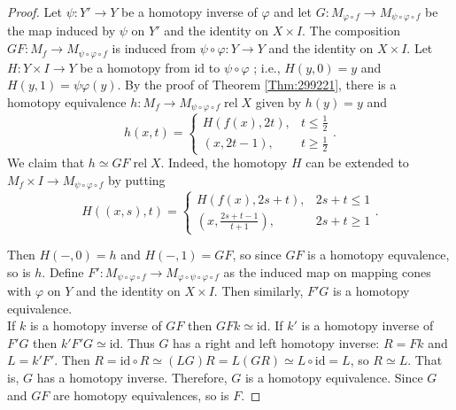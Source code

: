 \documentclass[reqno]{amsart}
\theoremstyle{definition}
\theoremstyle{remark}
\DeclareMathOperator{\rel}{rel}
\newcommand{\id}{{\mathrm{id}}}
\begin{document}
\begin{proof}
    Let $\psi  \colon Y' \to Y$ be a homotopy inverse
    of $\varphi $ and let $G \colon 
    M_{\varphi \circ f} \to M_{\psi \circ
    \varphi \circ f}$ be the map induced by
    $\psi $ on $Y'$ and the identity on $X \times I$.
    The composition $GF \colon M_f \to M_{\psi \circ \varphi 
    \circ f}$ is induced from $\psi \circ \varphi \colon
    Y \to Y$ and the identity on $X \times I$.
    Let $H \colon Y \times I \to Y$ be a homotopy from
    $\id$ to $\psi \circ \varphi $ ; i.e.,
    $H(y,0) = y$ and $H(y,1) = 
    \psi \varphi (y)$. 
    By the proof of Theorem \ref{Thm:299221}, there is a
    homotopy equivalence
    $h \colon M_f \to M_{\psi \circ \varphi \circ f}\rel X$ given
    by $h(y) = y$ and
     \[
    h(x,t) = 
    \begin{cases}
        H\left( f(x), 2t \right) ,& t\le \frac{1}{2}\\
        (x,2t-1),& t\ge \frac{1}{2}
    \end{cases}.
    \] 
    We claim that
    $h \simeq GF \rel X$. Indeed, the homotopy $H$ can
    be extended to 
    $M_f \times I \to M_{\psi \circ \varphi \circ f}$ by
    putting
    \[
    H\left( (x,s),t \right) 
    =
    \begin{cases}
        H\left( f(x), 2s+t \right) ,& 2s+t \le 1\\
        \left( x, \frac{2s+t-1}{t+1} \right) ,& 2s+t\ge 1
    \end{cases}.
    \] 

    Then $H\left( -,0 \right) = h$ and
    $H\left( -,1 \right) = GF$, so
    since $GF$ is a homotopy equvalence, so is
    $h$.
    Define $F' \colon
    M_{\psi \circ \varphi \circ f} \to 
    M_{\varphi \circ \psi \circ \varphi \circ f}$ 
    as the induced map on mapping cones
    with $\varphi $ on $Y$ and
    the identity on $X \times I$. Then similarly,
    $F' G$ is a homotopy equivalence.\\
    If $k$ is a homotopy inverse of $GF$ then
    $GF k \simeq \id$. If
    $k'$ is a homotopy inverse of $F'G$ then
    $k' F' G \simeq \id$. Thus $G$ has a right
    and left homotopy inverse: $R = Fk$ and
    $L = k'F'$. Then
    $R = \id \circ R \simeq 
    \left( LG \right) R =
    L \left( GR \right) \simeq L \circ \id = L$, so
    $R \simeq L$. That is, 
    $G$ has a homotopy inverse. Therefore,
    $G$ is a homotopy equivalence. Since $G$ and $GF$ are
    homotopy equivalences, so is $F$.
\end{proof}
\end{document}
